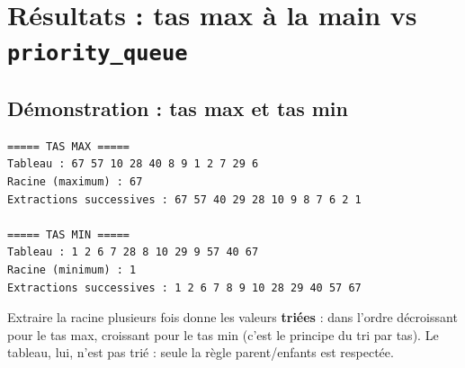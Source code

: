 \documentclass[12pt,a4paper]{report}
\begin{document}
\chapter{Résultats : tas max à la main vs \texttt{priority\_queue}}

\section{Démonstration : tas max et tas min}
\begin{lstlisting}[style=sortie]
===== TAS MAX =====
Tableau : 67 57 10 28 40 8 9 1 2 7 29 6
Racine (maximum) : 67
Extractions successives : 67 57 40 29 28 10 9 8 7 6 2 1

===== TAS MIN =====
Tableau : 1 2 6 7 28 8 10 29 9 57 40 67
Racine (minimum) : 1
Extractions successives : 1 2 6 7 8 9 10 28 29 40 57 67
\end{lstlisting}
Extraire la racine plusieurs fois donne les valeurs \textbf{triées} : dans l'ordre décroissant pour le tas max, croissant pour le tas min (c'est le principe du tri par tas). Le tableau, lui, n'est pas trié : seule la règle parent/enfants est respectée.
\end{document}
